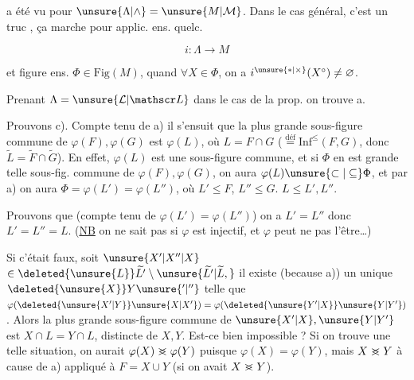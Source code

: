 
 a été vu pour $\unsure{\Lambda|\wedge}=\unsure{M|\mathcal M}$. Dans le cas général, c'est un truc , ça marche pour applic. ens. quelc.

\[
i:\Lambda\longrightarrow M
\]

et figure ens. $\Phi\in\mathrm{Fig}(M)$, quand $\forall X\in\Phi$, on a $i^{\unsure{*|\times}}(X^{\circ})\ne\varnothing$.

Prenant $\Lambda=\unsure{\mathcal L|\mathscr L}$ dans  le cas de la prop.  on trouve a.

Prouvons c).   Compte tenu de a) il s'ensuit que la plus grande sous-figure commune de $\varphi(F),\varphi(G)$ est $\varphi(L)$, où $L=F\cap G$  ($\overset{\mathrm{déf}}{=}\mathrm{Inf}^{\leq}(F,G)$, donc $\widetilde L=\widetilde F\cap\widetilde G$). En effet, $\varphi(L)$ est une  sous-figure commune, et si $\Phi$ en est  grande telle sous-fig. commune de $\varphi(F),\varphi(G)$, on aura $\varphi(L)\unsure{\subset|\subseteq}\Phi$,  et par a) on aura $\Phi=\varphi(L')=\varphi(L'')$, où $L'\leq F$, $L''\leq G$.  $L\leq L',L''$.

Prouvons que (compte tenu de $\varphi(L')=\varphi(L'')$) on a $L'=L''$ donc $L'=L''=L$. (\uline{NB} on ne sait pas si $\varphi$ est injectif, et $\varphi$ peut ne pas l'être\ldots)

Si c'était faux, soit $\unsure{X'|X''|X}$  $\in\deleted{\unsure{L}}\widetilde{L'}\setminus\unsure{\widetilde{L'}|\widetilde L,}$ il existe (because a)) un unique $\deleted{\unsure{X}}Y\unsure{^{\prime}|^{\prime\prime}}$  telle que $\varphi(\deleted{\unsure{X'|Y}}\unsure{X|X'})=\varphi(\deleted{\unsure{Y'|X}}\unsure{Y|Y'})$. Alors la plus grande sous-figure commune de $\unsure{X'|X},\unsure{Y|Y'}$ est $X\cap L=Y\cap L$, distincte de $X,Y$. Est-ce bien impossible ? Si on trouve une telle situation, on aurait $\varphi(X)\mathrel{>\mkern-13mu<}\varphi(Y)$ puisque $\varphi(X)=\varphi(Y)$, mais $X\mathrel{>\mkern-13mu<}Y$ à cause de a) appliqué à  $F=X\cup Y$ (si on avait $X\mathrel{>\mkern-13mu<}Y$).
